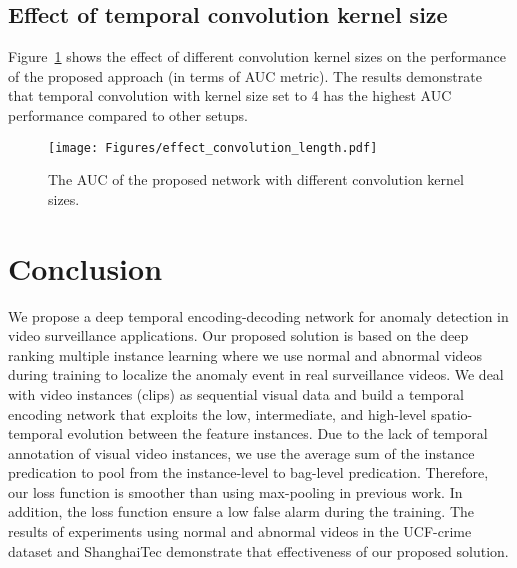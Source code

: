 \documentclass[journal]{IEEEtran}
\begin{document}
\subsection{Effect of temporal convolution kernel size}
Figure~\ref{fig:effect_of_conv_len} shows the effect of different convolution kernel sizes on the performance of the proposed approach (in terms of AUC metric). The results demonstrate that temporal convolution with kernel size set to 4 has the highest AUC performance compared to other setups.
\begin{figure}[t]
	\centering
	\texttt{[image: Figures/effect\_convolution\_length.pdf]}
	\caption{The AUC of the proposed network with different convolution kernel sizes.}
	\label{fig:effect_of_conv_len}
\end{figure}






























\section{Conclusion}
We propose a deep temporal encoding-decoding network for anomaly detection in video surveillance applications. Our proposed solution is based on the deep ranking multiple instance learning where we use normal and abnormal videos during training to localize the anomaly event in real surveillance videos. We deal with video instances (clips) as sequential visual data and build a temporal encoding network that exploits the low, intermediate, and high-level spatio-temporal evolution between the feature instances. Due to the lack of temporal annotation of visual video instances, we use the average sum of the instance predication to pool from the instance-level to bag-level predication. Therefore, our loss function is smoother than using max-pooling in previous work. In addition, the loss function ensure a low false alarm during the training. The results of experiments using normal and abnormal videos in the UCF-crime dataset and ShanghaiTec demonstrate that effectiveness of our proposed solution.
\end{document}
